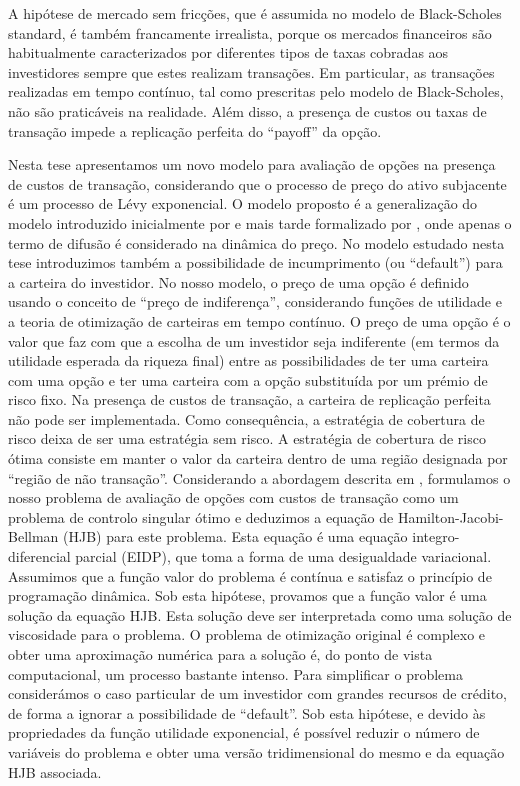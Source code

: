 A hipótese de mercado sem fricções, que é assumida no modelo de Black-Scholes standard, é também francamente irrealista, 
porque os mercados financeiros são habitualmente caracterizados por diferentes tipos de taxas cobradas aos investidores sempre que estes realizam transações. 
Em particular, as transações realizadas em tempo contínuo, tal como prescritas pelo modelo de Black-Scholes, não são praticáveis na realidade. 
Além disso, a presença de custos ou taxas de transação impede a replicação perfeita do “payoff” da opção. 

Nesta tese apresentamos um novo modelo para avaliação de opções na presença de custos de transação, 
considerando que o processo de preço do ativo subjacente é um processo de Lévy exponencial. 
O modelo proposto é a generalização do modelo introduzido inicialmente por \cite{HoNe89} e mais tarde formalizado por 
\cite{DaPaZa93}, onde apenas o termo de difusão é considerado na dinâmica do preço. 
No modelo estudado nesta tese introduzimos também a possibilidade de incumprimento (ou “default”) para a carteira do investidor. 
No nosso modelo, o preço de uma opção é definido usando o conceito de “preço de indiferença”, considerando funções de utilidade e a teoria de otimização de carteiras em tempo contínuo. 
O preço de uma opção é o valor que faz com que a escolha de um investidor seja indiferente (em termos da utilidade esperada da riqueza final) 
entre as possibilidades de ter uma carteira com uma opção e ter uma carteira com a opção substituída por um prémio de risco fixo. 
Na presença de custos de transação, a carteira de replicação perfeita não pode ser implementada. 
Como consequência, a estratégia de cobertura de risco deixa de ser uma estratégia sem risco.  
A estratégia de cobertura de risco ótima consiste em manter o valor da carteira dentro de uma região designada por “região de não transação”.  
Considerando a abordagem descrita em \cite{Kab16}, formulamos o nosso problema de avaliação de opções com custos de transação como um problema de controlo singular ótimo 
e deduzimos a equação de Hamilton-Jacobi-Bellman (HJB) para este problema. 
Esta equação é uma equação integro-diferencial parcial (EIDP), que toma a forma de uma desigualdade variacional. 
Assumimos que a função valor do problema é contínua e satisfaz o princípio de programação dinâmica. 
Sob esta hipótese, provamos que a função valor é uma solução da equação HJB. 
Esta solução deve ser interpretada como uma solução de viscosidade para o problema. 
O problema de otimização original é complexo e obter uma aproximação numérica para a solução é, do ponto de vista computacional, um processo bastante intenso. 
Para simplificar o problema considerámos o caso particular de um investidor com grandes recursos de crédito, de forma a ignorar a possibilidade de “default”. 
Sob esta hipótese, e devido às propriedades da função utilidade exponencial, é possível reduzir o número de variáveis do problema e obter uma versão tridimensional do mesmo 
e da equação HJB associada. 

